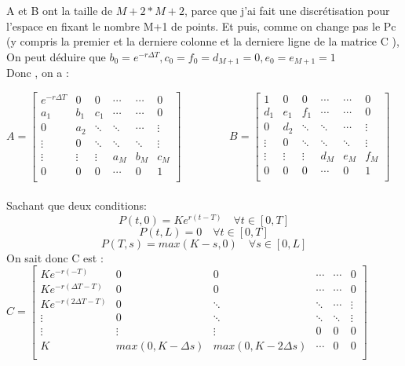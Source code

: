 \documentclass[a4paper, 12pt]{article}
\begin{document}
A et B ont la taille de $M+2* M+2$, parce que j'ai fait une discrétisation pour l'espace en fixant le nombre M+1 de points. Et puis,  comme on change pas le Pc (y compris la premier et la derniere colonne et la derniere ligne de la matrice C ), On peut déduire que $b_0 = e^{-r\Delta T} , c_0 = f_0 = d_{M+1}=0 , e_0 =e_{M+1} = 1 $ \\ 

Donc , on a :


 $A = \left[
\begin{matrix}
 e^{-r\Delta T}      & 0     & 0      & \cdots & \cdots & 0      \\
 a_1      & b_1      & c_1     & \cdots & \cdots & 0      \\
 0      & a_2     & \ddots      & \ddots & \cdots & \vdots      \\
 \vdots      & 0      & \ddots      & \ddots & \ddots & \vdots     \\
 \vdots      & \vdots      & \vdots       & a_M & b_M & c_{M}        \\
 0      & 0      & 0      & \cdots & 0 & 1     \\
\end{matrix}
\right]$ $\quad$ $\quad$ $\quad$
$B = \left[
\begin{matrix}
 1     & 0     & 0      & \cdots & \cdots & 0      \\
 d_1      & e_1      & f_1      & \cdots & \cdots & 0      \\
 0      & d_2      & \ddots      & \ddots & \cdots & \vdots      \\
 \vdots      & 0      & \ddots      & \ddots & \ddots & \vdots     \\
 \vdots      & \vdots      & \vdots      & d_M & e_M & f_{M}        \\
 0      & 0      & 0      & \cdots & 0 & 1     \\
\end{matrix}
\right]$\\\\

{Sachant que deux conditions:}
\[P(t,0) = Ke^{r(t-T)}\quad  \forall t \in [0,T]\]
\[P(t,L) = 0\quad  \forall t \in [0,T]\]
\[P(T,s) = max(K - s, 0)\quad  \forall s \in [0,L]\]
On sait donc  C est :\\

$C = \left[
\begin{matrix}
 Ke^{-r(-T)}      & 0     & 0      & \cdots & \cdots & 0      \\
 Ke^{-r(\Delta T-T)}      & 0      & 0    & \cdots & \cdots & 0      \\
  Ke^{-r(2\Delta T-T)}     & 0     & \ddots      & \ddots & \cdots & \vdots      \\
 \vdots      & 0      & \ddots      & \ddots & \ddots & \vdots     \\
 \vdots      & \vdots      & \vdots       & 0 & 0 & 0        \\
 K      & max(0,K-\Delta s)      & max(0,K-2\Delta s)        & \cdots & 0 & 0     \\
\end{matrix}
\right]$\\\\
\end{document}
